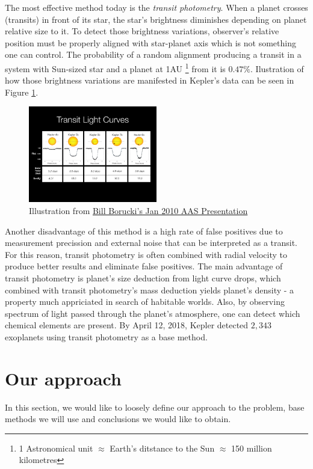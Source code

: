 \documentclass[twoside]{article}
\begin{document}
\begin{multicols}{2}
The most effective method today is the \textit{transit photometry}. When a planet crosses (transits) in front of its star, the star's brightness diminishes depending on planet relative size to it. To detect those brightness variations, observer's relative position must be properly aligned with star-planet axis which is not something one can control. The probability of a random alignment producing a transit in a system with Sun-sized star and a planet at 1AU \footnote{1 Astronomical unit $\approx$ Earth's ditstance to the Sun $\approx$ 150 million kilometres} from it is $0.47\%$. Ilustration of how those brightness variations are manifested in Kepler's data can be seen in Figure \ref{fig:kepler_curves}.
\begin{figure}[H]
\includegraphics[width=0.5\textwidth]{KeplerLightCurves}
\caption{Illustration from \href{https://www.nasa.gov/mission_pages/kepler/main/index.html?FuseAction=ShowNews&NewsID=16}{Bill Borucki's Jan 2010 AAS Presentation}}
\label{fig:kepler_curves}
\end{figure}
\noindent Another disadvantage of this method is a high rate of false positives due to measurement precission and external noise that can be interpreted as a transit. For this reason, transit photometry is often combined with radial velocity to produce better results and eliminate false positives. The main advantage of transit photometry is planet's size deduction from light curve drops, which combined with transit photometry's mass deduction yields planet's density - a property much appriciated in search of habitable worlds. Also, by observing spectrum of light passed through the planet's atmosphere, one can detect which chemical elements are present. By April 12, 2018, Kepler detected $2,343$ exoplanets using transit photometry as a base method.




\section{Our approach}
In this section, we would like to loosely define our approach to the problem, base methods we will use and conclusions we would like to obtain.


\end{multicols}
\end{document}
